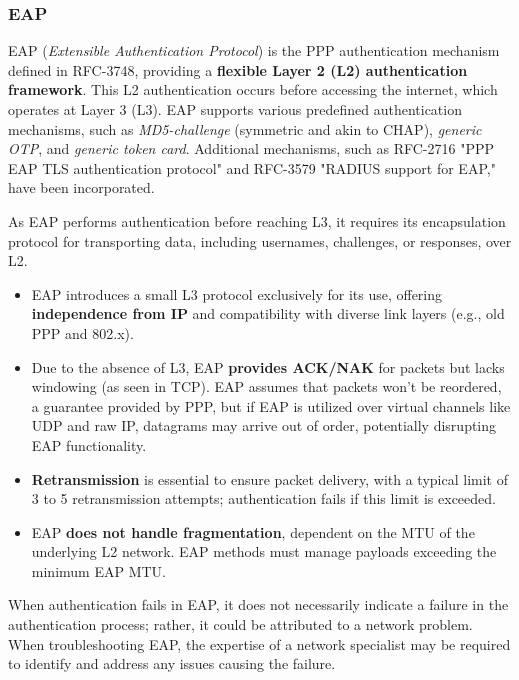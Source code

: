 \subsubsection{EAP}
EAP (\textit{Extensible Authentication Protocol}) is the PPP authentication mechanism  defined in RFC-3748, providing a \textbf{flexible Layer 2 (L2) authentication framework}. This L2 authentication occurs before accessing the internet, which operates at Layer 3 (L3). EAP supports various predefined authentication mechanisms, such as \textit{MD5-challenge} (symmetric and akin to CHAP), \textit{generic OTP}, and \textit{generic token card}.
Additional mechanisms, such as RFC-2716 "PPP EAP TLS authentication protocol" and RFC-3579 "RADIUS support for EAP," have been incorporated.

As EAP performs authentication before reaching L3, it requires its encapsulation protocol for transporting data, including usernames, challenges, or responses, over L2.

\begin{itemize}
    \item EAP introduces a small L3 protocol exclusively for its use, offering \textbf{independence from IP} and compatibility with diverse link layers (e.g., old PPP and 802.x).
    \item Due to the absence of L3, EAP \textbf{provides ACK/NAK} for packets but lacks windowing (as seen in TCP). EAP assumes that packets won't be reordered, a guarantee provided by PPP, but if EAP is utilized over virtual channels like UDP and raw IP, datagrams may arrive out of order, potentially disrupting EAP functionality.
    \item \textbf{Retransmission} is essential to ensure packet delivery, with a typical limit of 3 to 5 retransmission attempts; authentication fails if this limit is exceeded.
    \item EAP \textbf{does not handle fragmentation}, dependent on the MTU of the underlying L2 network. EAP methods must manage payloads exceeding the minimum EAP MTU.
\end{itemize}


When authentication fails in EAP, it does not necessarily indicate a failure in the authentication process; rather, it could be attributed to a network problem. When troubleshooting EAP, the expertise of a network specialist may be required to identify and address any issues causing the failure.

